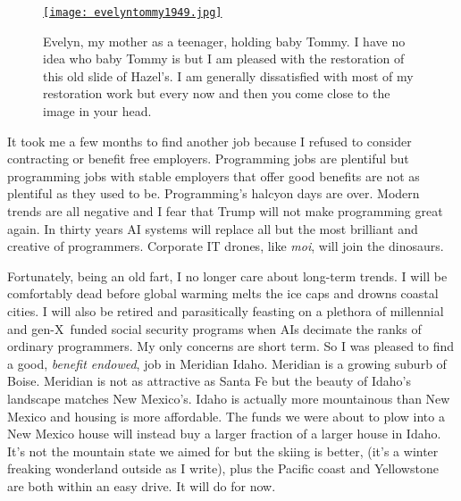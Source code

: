 
\captionsetup[figure]{labelformat=empty}
\begin{SCfigure}
\centering
\href{https://conceptcontrol.smugmug.com/People/From-Hazels-Albums-1/i-tLbfswS/A}{\texttt{[image: evelyntommy1949.jpg]}}
\caption{Evelyn, my mother as a teenager, holding baby Tommy. I have no idea who
baby Tommy is but I am pleased with the restoration of this old slide of
Hazel's. I am generally dissatisfied with most of my restoration work
but every now and then you come close to the image in your
head.}
\label{fig:5275X1}
\end{SCfigure}



It took me a few months to find another job because I refused to
consider contracting or benefit free employers. Programming jobs are
plentiful but programming jobs with stable employers that offer good
benefits are not as plentiful as they used to be. Programming's halcyon
days are over. Modern trends are all negative and I fear that Trump will
not make programming great again. In thirty years AI systems will
replace all but the most brilliant and creative of programmers.
Corporate IT drones, like \emph{moi}, will join the dinosaurs.

Fortunately, being an old fart, I no longer care about long-term trends.
I will be comfortably dead before global warming melts the ice caps and
drowns coastal cities. I will also be retired and parasitically feasting
on a plethora of millennial and gen-X~funded social security programs
when AIs decimate the ranks of ordinary programmers. My only concerns
are short term. So I was pleased to find a good, \emph{benefit endowed},
job in Meridian Idaho. Meridian is a growing suburb of Boise. Meridian
is not as attractive as Santa Fe but the beauty of Idaho's landscape
matches New Mexico's. Idaho is actually more mountainous than New Mexico
and housing is more affordable. The funds we were about to plow into a
New Mexico house will instead buy a larger fraction of a larger house in
Idaho. It's not the mountain state we aimed for but the skiing is
better, (it's a winter freaking wonderland outside as I write), plus the
Pacific coast and Yellowstone are both within an easy drive. It will do
for now.

